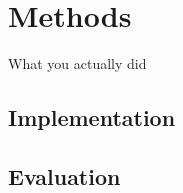 \chapter{Methods}
\label{chap:methods}

What you actually did

\section{Implementation}


\section{Evaluation}